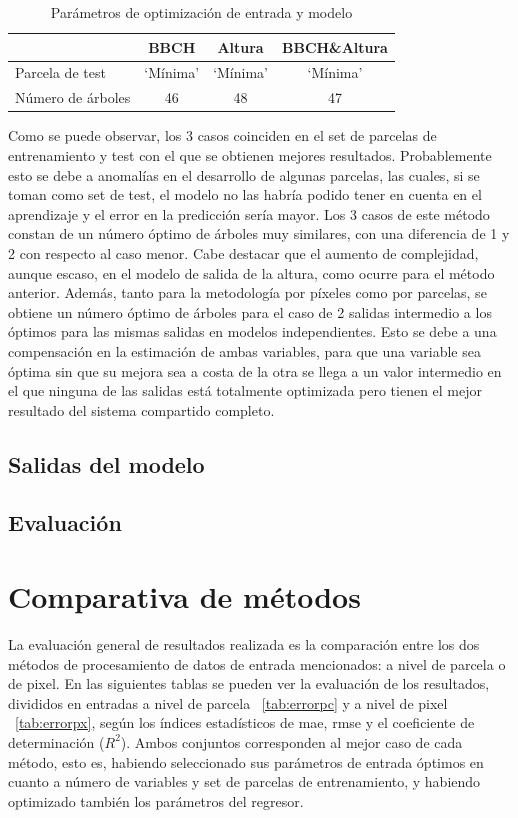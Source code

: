 \begin{table}[h]
\centering
\begin{tabular}{l|ccc}
                  & BBCH     & Altura   & BBCH\&Altura \\ \hline
Parcela de test   & `Mínima' & `Mínima' & `Mínima'     \\
Número de árboles & 46       & 48       & 47          
\end{tabular}
\caption{Parámetros de optimización de entrada y modelo \label{tab:opt_pixl}}
\end{table}

\par Como se puede observar, los 3 casos coinciden en el set de parcelas de entrenamiento y test con el que se obtienen mejores resultados. Probablemente esto se debe a anomalías en el desarrollo de algunas parcelas, las cuales, si se toman como set de test, el modelo no las habría podido tener en cuenta en el aprendizaje y el error en la predicción sería mayor. Los 3 casos de este método constan de un número óptimo de árboles muy similares, con una diferencia de 1 y 2 con respecto al caso menor. Cabe destacar que el aumento de complejidad, aunque escaso, en el modelo de salida de la altura, como ocurre para el método anterior. Además, tanto para la metodología por píxeles como por parcelas, se obtiene un número óptimo de árboles para el caso de 2 salidas intermedio a los óptimos para las mismas salidas en modelos independientes. Esto se debe a una compensación en la estimación de ambas variables, para que una variable sea óptima sin que su mejora sea a costa de la otra se llega a un valor intermedio en el que ninguna de las salidas está totalmente optimizada pero tienen el mejor resultado del sistema compartido completo. 


\subsection{Salidas del modelo}
\subsection{Evaluación}
\section{Comparativa de métodos}
\par La evaluación general de resultados realizada es la comparación entre los dos métodos de procesamiento de datos de entrada mencionados: a nivel de parcela o de pixel. En las siguientes tablas se pueden ver la evaluación de los resultados, divididos en entradas a nivel de parcela ~\ref{tab:errorpc} y a nivel de pixel ~\ref{tab:errorpx}, según los índices estadísticos de \gls{mae}, \gls{rmse} y el coeficiente de determinación ($R^2$). Ambos conjuntos corresponden al mejor caso de cada método, esto es, habiendo seleccionado sus parámetros de entrada óptimos en cuanto a número de variables y set de parcelas de entrenamiento, y habiendo optimizado también los parámetros del regresor.

